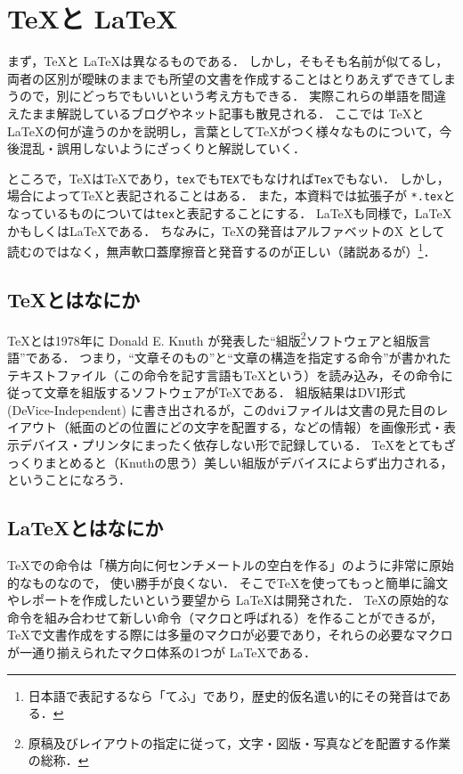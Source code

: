 \documentclass[./main]{subfiles}
\begin{document}
\section{\TeX と \LaTeX}

\noindent
まず，\TeX と \LaTeX は異なるものである．
しかし，そもそも名前が似てるし，両者の区別が曖昧のままでも所望の文書を作成することはとりあえずできてしまうので，別にどっちでもいいという考え方もできる．
実際これらの単語を間違えたまま解説しているブログやネット記事も散見される．
ここでは \TeX と \LaTeX の何が違うのかを説明し，言葉として\TeX がつく様々なものについて，今後混乱・誤用しないようにざっくりと解説していく．

ところで，\TeX は\TeX であり，\verb|tex|でも\verb|TEX|でもなければ\verb|Tex|でもない．
しかし，場合によってTeXと表記されることはある．
また，本資料では拡張子が \verb|*.tex|となっているものについては\verb|tex|と表記することにする．
\LaTeX も同様で，\LaTeX かもしくはLaTeXである．
ちなみに，\TeX の発音はアルファベットのX として読むのではなく，無声軟口蓋摩擦音と発音するのが正しい（諸説あるが）\footnote{
  日本語で表記するなら「てふ」であり，歴史的仮名遣い的にその発音はである．
}．

\subsection{\TeX とはなにか}
\noindent
\TeX とは1978年に Donald E. Knuth\supercite{KnuthHP} が発表した``組版\footnote{原稿及びレイアウトの指定に従って，文字・図版・写真などを配置する作業の総称\supercite{Typesetting_Wikipedia}．}ソフトウェアと組版言語''である\supercite{reutenauer2008brief}．
つまり，``文章そのもの''と``文章の構造を指定する命令''が書かれたテキストファイル（この命令を記す言語も\TeX という）を読み込み，その命令に従って文章を組版するソフトウェアが\TeX である．
組版結果はDVI形式 (DeVice-Independent) に書き出されるが，この\verb|dvi|ファイルは文書の見た目のレイアウト（紙面のどの位置にどの文字を配置する，などの情報）を画像形式・表示デバイス・プリンタにまったく依存しない形で記録している\supercite{TeXdiff_wtsnjp}．
\TeX をとてもざっくりまとめると（Knuthの思う）美しい組版がデバイスによらず出力される，ということになろう．

\subsection{\LaTeX とはなにか}
\noindent
\TeX での命令は「横方向に何センチメートルの空白を作る」のように非常に原始的なものなので，
使い勝手が良くない．
そこで\TeX を使ってもっと簡単に論文やレポートを作成したいという要望から \LaTeX は開発された\supercite{LaTeX_TeXWiki}．
\TeX の原始的な命令を組み合わせて新しい命令（マクロと呼ばれる）を作ることができるが，\TeX で文書作成をする際には多量のマクロが必要であり，それらの必要なマクロが一通り揃えられたマクロ体系の1つが \LaTeX である．
\end{document}
